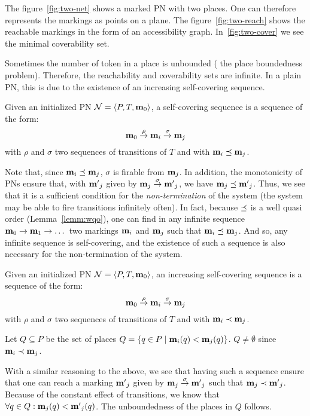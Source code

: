 The figure~\ref{fig:two-net} shows a marked \ac{PN} with two places.
One can therefore represents the markings as points on a plane.
The figure~\ref{fig:two-reach} shows the reachable markings in the form of an accessibility graph.
In~\ref{fig:two-cover} we see the minimal coverability set.

Sometimes the number of token in a place is unbounded ( the place boundedness problem).
Therefore, the reachability and coverability sets are infinite.
In a plain \ac{PN}, this is due to the existence of an increasing self-covering sequence.
\begin{defi}
  Given an initialized \ac{PN} $\mathcal{N} = \langle P,T, \mathbf{m}_0\rangle$,
  a self-covering sequence is a sequence of the form:
  \[
    \mathbf{m}_0 \stackrel{\rho}{\to} \mathbf{m}_i \stackrel{\sigma}{\to} \mathbf{m}_j
  \]
  with $\rho$ and $\sigma$ two sequences of transitions of $T$
  and with $\mathbf{m}_i \preceq \mathbf{m}_j$.
\end{defi}

Note that, since $\mathbf{m}_i \preceq \mathbf{m}_j$, $\sigma$ is firable from $\mathbf{m}_j$.
In addition, the monotonicity of \acp{PN} ensure that, with $\mathbf{m'}_j$ given by $\mathbf{m}_j \stackrel{\sigma}{\to} \mathbf{m'}_j$, we have $\mathbf{m}_j \preceq \mathbf{m'}_j$.
Thus, we see that it is a sufficient condition for the \emph{non-termination} of the system (the system may be able to fire transitions infinitely often).
In fact, because $\preceq$ is a well quasi order (Lemma~\ref{lemm:wqo}), one can find in any infinite sequence $\mathbf{m}_0 \stackrel{}{\to} \mathbf{m}_1 \stackrel{}{\to} \dots$ two markings $\mathbf{m}_i$ and $\mathbf{m}_j$ such that $\mathbf{m}_i \preceq \mathbf{m}_j$.
And so, any infinite sequence is self-covering, and the existence of such a sequence is also necessary for the non-termination of the system.

\begin{defi}
  Given an initialized \ac{PN} $\mathcal{N} = \langle P,T, \mathbf{m}_0\rangle$,
  an increasing self-covering sequence is a sequence of the form:
  \[
    \mathbf{m}_0 \stackrel{\rho}{\to} \mathbf{m}_i \stackrel{\sigma}{\to} \mathbf{m}_j
  \]
  with $\rho$ and $\sigma$ two sequences of transitions of $T$
  and with $\mathbf{m}_i \prec \mathbf{m}_j$.
\end{defi}

Let $Q \subseteq P$ be the set of places $Q = \{q \in P \mid \mathbf{m}_i(q) < \mathbf{m}_j(q)\}$.
$Q \neq \emptyset$ since $\mathbf{m}_i \prec \mathbf{m}_j$.

With a similar reasoning to the above, we see that having such a sequence ensure that one can reach a marking $\mathbf{m'}_j$ given by $\mathbf{m}_j \stackrel{\sigma}{\to} \mathbf{m'}_j$ such that $\mathbf{m}_j \prec \mathbf{m'}_j$.
Because of the constant effect of transitions, we know that $\forall q \in Q : \mathbf{m}_j(q) < \mathbf{m'}_j(q)$.
The unboundedness of the places in $Q$ follows.



